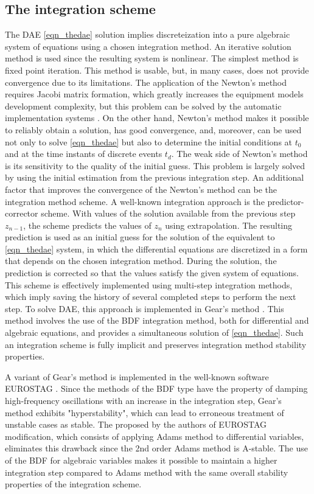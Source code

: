 \documentclass[lettersize,journal]{IEEEtran}
\begin{document}
\subsection{The integration scheme}

The DAE \eqref{eqn_thedae} solution implies discreteization into a pure algebraic system of equations using a chosen integration method. An iterative solution method is used since the resulting system is nonlinear. The simplest method is fixed point iteration. This method is usable, but, in many cases, does not provide convergence due to its limitations. The application of the Newton's method requires Jacobi matrix formation, which greatly increases the equipment models development complexity, but this problem can be solved by the automatic implementation systems \cite{mycompiler}. On the other hand, Newton's method makes it possible to reliably obtain a solution, has good convergence, and, moreover, can be used not only to solve \eqref{eqn_thedae} but also to determine the initial conditions at \(t_0\) and at the time instants of discrete events \(t_d\). The weak side of Newton's method is its sensitivity to the quality of the initial guess. This problem is largely solved by using the initial estimation from the previous integration step. An additional factor that improves the convergence of the Newton's method can be the integration method scheme. A well-known integration approach is the predictor-corrector scheme. With values of the solution available from the previous step \(z_{n-1}\), the scheme predicts the values of \(z_n\) using extrapolation. The resulting prediction is used as an initial guess for the solution of the equivalent to \eqref{eqn_thedae} system, in which the differential equations are discretized in a form that depends on the chosen integration method. During the solution, the prediction is corrected so that the values satisfy the given system of equations. This scheme is effectively implemented using multi-step integration methods, which imply saving the history of several completed steps to perform the next step. To solve DAE, this approach is implemented in Gear's method \cite{gear71}. This method involves the use of the BDF integration method, both for differential and algebraic equations, and provides a simultaneous solution of \eqref{eqn_thedae}. Such an integration scheme is fully implicit and preserves integration method stability properties.

A variant of Gear's method is implemented in the well-known software EUROSTAG \cite{mixedadams}. Since the methods of the BDF type have the property of damping high-frequency oscillations with an increase in the integration step, Gear's method exhibits "hyperstability", which can lead to erroneous treatment of unstable cases as stable. The proposed by the authors of EUROSTAG modification, which consists of applying Adams method to differential variables, eliminates this drawback since the 2nd order Adams method is A-stable. The use of the BDF for algebraic variables makes it possible to maintain a higher integration step compared to Adams method with the same overall stability properties of the integration scheme.
\end{document}
